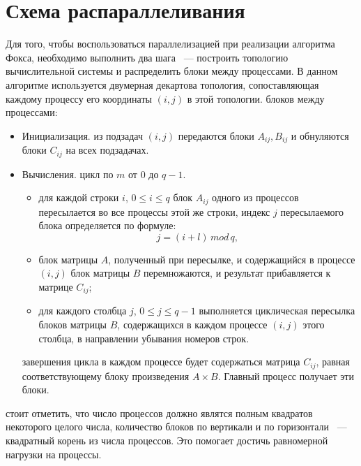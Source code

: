\documentclass{report}
\begin{document}
\section*{Схема распараллеливания}
Для того, чтобы воспользоваться параллелизацией при реализации алгоритма Фокса, необходимо выполнить два шага ~--- построить топологию вычислительной системы и распределить блоки между процессами.
В данном алгоритме используется двумерная декартова топология, сопоставляющая каждому процессу его координаты {\itshape $(i,j)$} в этой топологии.
 блоков между процессами:
\begin{itemize}
    \item Инициализация.
     из подзадач {\itshape $(i,j)$} передаются блоки {\itshape $A_{ij}, B_{ij}$} и обнуляются блоки {\itshape $C_{ij}$} на всех подзадачах.
    \item Вычисления.
     цикл по {\itshape $m$} от {\itshape $0$} до {\itshape $q - 1$}.
     \begin{itemize}
        \item для каждой строки {\itshape $i$}, {\itshape $0 \le i \le q$} блок {\itshape $A_{ij}$} одного из процессов пересылается во все процессы этой же строки, индекс {\itshape $j$} пересылаемого блока определяется по формуле:
             $$
            {\mathit j = (i + l) \, mod \, q,}
            $$
        \item блок матрицы {\itshape $A$}, полученный при пересылке, и содержащийся в процессе {\itshape $(i,j)$} блок матрицы {\itshape $B$} перемножаются, и результат прибавляется к матрице {\itshape $C_{ij}$}; 
        \item для каждого столбца {\itshape $j$}, {\itshape $0 \le j \le q - 1$} выполняется циклическая пересылка блоков матрицы {\itshape $B$}, содержащихся в каждом процессе {\itshape $(i,j)$} этого столбца, в направлении убывания номеров строк.
    \end{itemize}
 завершения цикла в каждом процессе будет содержаться матрица {\itshape $C_{ij}$}, равная соответствующему блоку произведения {\itshape $A  \times B$}. Главный процесс получает эти блоки.
\end{itemize}
 стоит отметить, что число процессов должно являтся полным квадратов некоторого целого числа, количество блоков по вертикали и по горизонтали ~--- квадратный корень из числа процессов. Это помогает достичь равномерной нагрузки на процессы.
\end{document}
